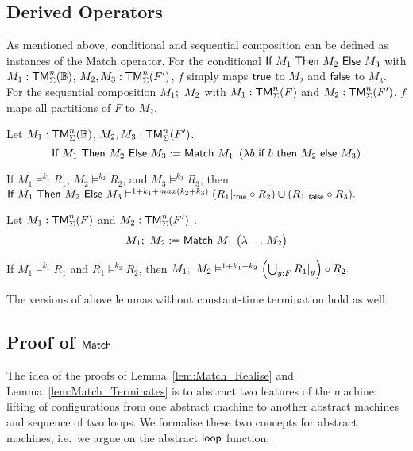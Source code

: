 \subsection{Derived Operators}
\label{sec:match-derived-operators}

As mentioned above, conditional and sequential composition can be defined as instances of the Match operator.  For the conditional
$\textsf{If}~M_1~\textsf{Then}~M_2~\textsf{Else}~M_3$ with $M_1 : \textsf{TM}_\Sigma^n(\mathbb{B})$, $M_2, M_3 : \textsf{TM}_\Sigma^n(F')$, $f$ simply maps $\textsf{true}$ to $M_2$ and $\textsf{false}$ to $M_3$.  For the
sequential composition $M_1 ;~ M_2$ with $M_1 : \textsf{TM}_\Sigma^n(F)$ and $M_2 : \textsf{TM}_\Sigma^n(F')$, $f$ maps all partitions of $F$ to $M_2$.

\begin{definition}[Conditional]
  \label{def:If}
  Let $M_1 : \textsf{TM}_\Sigma^n(\mathbb{B})$, $M_2, M_3 : \textsf{TM}_\Sigma^n(F')$.
  \[
    \textsf{If}~M_1~\textsf{Then}~M_2~\textsf{Else}~M_3 := \textsf{Match}~M_1~
    \left(\lambda b{.}\hskip.7pt\textsf{if}~b~\textsf{then}~M_2~\textsf{else}~M_3 \right)
  \]
\end{definition}

\begin{lemma}
  \label{lem:If_RealiseIn}
  If $M_1 \vDash^{k_1} R_1$, $M_2 \vDash^{k_2} R_2$, and $M_3 \vDash^{k_3} R_3$, then
  $
    \textsf{If}~M_1~\textsf{Then}~M_2~\textsf{Else}~M_3 \vDash^{1+k_1+max(k_2+k_3)} (R_1{|}_{\textsf{true}} \circ R_2) \cup (R_1{|}_{\textsf{false}} \circ R_3).
  $
\end{lemma}

\begin{definition}
  \label{def:Seq}
  Let $M_1 : \textsf{TM}_\Sigma^n(F)$ and $M_2 : \textsf{TM}_\Sigma^n(F')$ .
  \[
    M_1 ;~ M_2 := \textsf{Match}~M_1~
    \bigl(
    \lambda~\_.~M_2
    \bigr)
  \]
\end{definition}

\begin{lemma}
  \label{lem:Seq_RealiseIn}
  If $M_1 \vDash^{k_1} R_1$ and $R_1 \vDash^{k_2} R_2$, then
  $
  M_1 ;~ M_2 \vDash^{1+k_1+k_2} \left(\bigcup_{y:F} R_1{|}_{y}\right) \circ R_2.
  $
\end{lemma}

The versions of above lemmas without constant-time termination hold as well.


\subsection{Proof of $\textsf{Match}$}
\label{sec:match-proofs}

The idea of the proofs of Lemma~\ref{lem:Match_Realise} and Lemma~\ref{lem:Match_Terminates} is to abstract two features of the machine: lifting of
configurations from one abstract machine to another abstract machines and sequence of two loops.  We formalise these two concepts for abstract
machines, i.e.\ we argue on the abstract $\textsf{loop}$ function.

